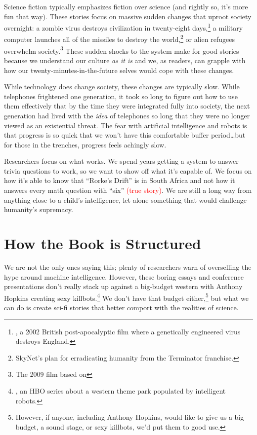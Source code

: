 Science fiction typically emphasizes fiction over science (and rightly
so, it's more fun that way).  These stories focus on massive sudden
changes that uproot society overnight: a zombie virus destroys
civilization in twenty-eight days,\footnote{, a
2002 British post-apocalyptic film where a genetically engineered
virus destroys England.} a military computer launches all of the
missiles to destroy the world,\footnote{SkyNet's plan for erradicating
humanity from the Terminator franchise.} or alien refugees overwhelm
society.\footnote{The 2009 film  based
on } These sudden shocks to the system make for
good stories because we understand our culture \emph{as it is} and we,
as readers, can grapple with how our twenty-minutes-in-the-future
selves would cope with these changes.


While technology does change society, these changes are typically slow.  While telephones frightened one generation, it took so long to figure out how to use them effectively that by the time they were integrated fully into society, the next generation had lived with the \emph{idea} of telephones so long that they were no longer viewed as an existential threat.  The fear with artificial intelligence and robots is that progress is so quick that we won't have this comfortable buffer period\dots but for those in the trenches, progress feels achingly slow.  

Researchers focus on what works.  We spend years getting a system to answer trivia questions to work, so we want to show off what it's capable of.  We focus on how it's able to know that ``Rorke's Drift'' is in South Africa and not how it answers every math question with ``six'' \textcolor{red}{(true story)}.  We are still a long way from anything close to a child's intelligence, let alone something that would challenge humanity's supremacy.  

\section{How the Book is Structured}

We are not the only ones saying this; plenty of researchers warn of overselling the hype around machine intelligence.  However, these boring essays and conference presentations don't really stack up against a big-budget western with Anthony Hopkins creating sexy killbots.\footnote{, an HBO series about a western theme park populated by intelligent robots.}  We don't have that budget either,\footnote{However, if anyone, including Anthony Hopkins, would like to give us a big budget, a sound stage, or sexy killbots, we'd put them to good use.} but what we can do is create sci-fi stories that better comport with the realities of science.

